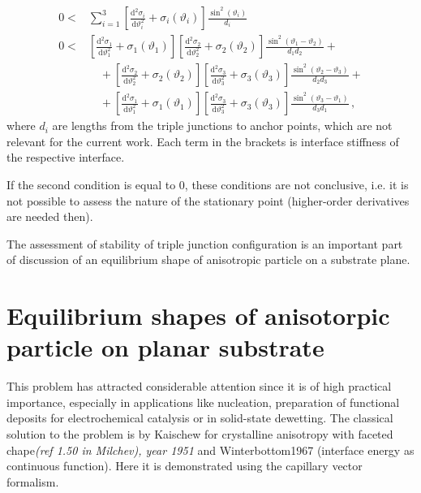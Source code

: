 \begin{align} \label{eq_3jun_aniso_stabcond1}
    0 <& \sum_{i=1}^3 \left[ \frac{\mathrm{d}^2 \sigma_i}{\mathrm{d} \vartheta_i^2} + \sigma_i(\vartheta_i) \right]\frac{\sin^2(\vartheta_i)}{d_i} \\  \label{eq_3jun_aniso_stabcond2}
    0 <& \left[ \frac{\mathrm{d}^2 \sigma_1}{\mathrm{d} \vartheta_1^2} + \sigma_1(\vartheta_1) \right]\left[ \frac{\mathrm{d}^2 \sigma_2}{\mathrm{d} \vartheta_2^2} + \sigma_2(\vartheta_2) \right] \frac{\sin^2(\vartheta_1-\vartheta_2)}{d_1d_2} +    \\
     &\quad +\left[ \frac{\mathrm{d}^2 \sigma_2}{\mathrm{d} \vartheta_2^2} + \sigma_2(\vartheta_2) \right]\left[ \frac{\mathrm{d}^2 \sigma_3}{\mathrm{d} \vartheta_3^2} +  \sigma_3(\vartheta_3) \right] \frac{\sin^2(\vartheta_2-\vartheta_3)}{d_2d_3} + \nonumber \\
     &\quad + \left[ \frac{\mathrm{d}^2 \sigma_1}{\mathrm{d} \vartheta_1^2} + \sigma_1(\vartheta_1) \right]\left[ \frac{\mathrm{d}^2 \sigma_3}{\mathrm{d} \vartheta_3^2} + \sigma_3(\vartheta_3) \right]  \frac{\sin^2(\vartheta_3-\vartheta_1)}{d_3d_1} \nonumber \,,
\end{align}
where $d_i$ are lengths from the triple junctions to anchor points, which are not relevant for the current work. Each term in the brackets is interface stiffness of the respective interface.

If the second condition is equal to 0, these conditions are not conclusive, i.e. it is not possible to assess the nature of the stationary point (higher-order derivatives are needed then). 

The assessment of stability of triple junction configuration is an important part of discussion of an equilibrium shape of anisotropic particle  on a substrate plane.

\section{Equilibrium shapes of anisotorpic particle on planar substrate}
This problem has attracted considerable attention since it is of high practical importance, especially in applications like nucleation, preparation of functional deposits for electrochemical catalysis or in solid-state dewetting. The classical solution to the problem is by Kaischew for crystalline anisotropy with faceted chape\textit{(ref 1.50 in Milchev), year 1951} and Winterbottom1967 (interface energy as continuous function). Here it is demonstrated using the capillary vector formalism. 

